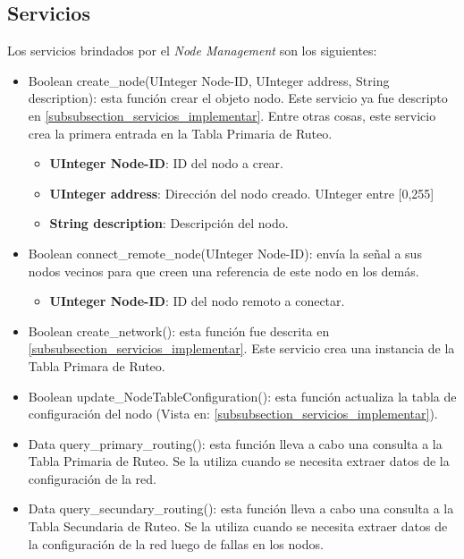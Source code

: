 \subsection{Servicios}
Los servicios brindados por el \textit{Node Management} son los siguientes:
\begin{itemize}
\item Boolean create\_node(UInteger Node-ID, UInteger address, String
  description): esta función crear el objeto nodo. Este servicio ya fue
  descripto en \ref{subsubsection_servicios_implementar}. Entre otras cosas,
  este servicio crea la primera entrada en la Tabla Primaria de Ruteo. 
  \begin{itemize}
  \item \textbf{UInteger Node-ID}: ID del nodo a crear.
  \item \textbf{UInteger address}: Dirección del nodo creado. UInteger entre [0,255]
  \item \textbf{String description}: Descripción del nodo.
  \end{itemize}

\item Boolean connect\_remote\_node(UInteger Node-ID): envía la señal a sus
  nodos vecinos para que creen una referencia de este nodo en los demás. 
  \begin{itemize}
    \item \textbf{UInteger Node-ID}: ID del nodo remoto a conectar.
  \end{itemize}

\item Boolean create\_network(): esta función fue descrita en
  \ref{subsubsection_servicios_implementar}. Este servicio crea una instancia de
  la Tabla Primara de Ruteo.

\item Boolean update\_NodeTableConfiguration(): esta función actualiza la tabla
  de configuración del nodo
  (Vista en: \ref{subsubsection_servicios_implementar}).

\item Data query\_primary\_routing(): esta función lleva a cabo una consulta a
  la Tabla Primaria de Ruteo. Se la utiliza cuando se necesita extraer datos de
  la configuración de la red.

\item Data query\_secundary\_routing(): esta función lleva a cabo una consulta a
  la Tabla Secundaria de Ruteo. Se la utiliza cuando se necesita extraer datos de
  la configuración de la red luego de fallas en los nodos.


\end{itemize}
